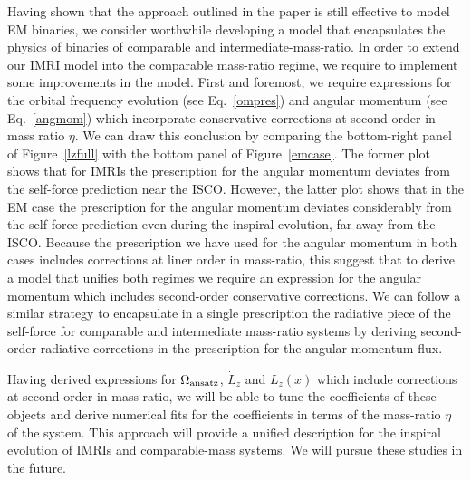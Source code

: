 Having shown that the approach outlined in the paper is still effective to model EM binaries, we consider worthwhile developing a model that encapsulates the physics of binaries of comparable and intermediate-mass-ratio. In order to extend our IMRI model into the comparable mass-ratio regime, we require to implement some improvements in the model.  First and foremost, we require expressions for the orbital frequency evolution (see Eq.~\eqref{ompres}) and angular momentum (see Eq.~\eqref{angmom}) which incorporate conservative corrections at second-order in mass ratio \(\eta\). We can draw this conclusion by comparing the bottom-right panel of Figure~\ref{lzfull} with the bottom panel of Figure~\ref{emcase}. The former plot shows that for IMRIs the prescription for the angular momentum  deviates from the self-force prediction near the ISCO. However, the latter plot shows that in the EM case the prescription for the angular momentum deviates considerably from the self-force prediction even during the inspiral 
evolution, far away from the ISCO. Because the prescription we have used for the angular momentum in both cases includes corrections at liner order in mass-ratio, this suggest that to derive a model that unifies both regimes we require  an expression for the angular momentum which includes second-order conservative corrections. We can follow a similar strategy to encapsulate in a single prescription the radiative piece of the self-force for comparable and intermediate mass-ratio systems by deriving second-order radiative corrections in the prescription for the angular momentum flux. 

Having derived expressions for \(\Omega_{\rm ansatz}\), \(\dot{L}_z\) and \(L_{z}(x)\) which include corrections at second-order in mass-ratio, we will be able to tune the coefficients of these objects and derive numerical fits for the coefficients in terms of the mass-ratio \(\eta\) of the system. This approach will provide a unified description for the inspiral evolution of IMRIs and comparable-mass systems. We will pursue these studies in the future.
